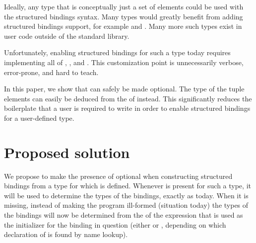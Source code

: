 Ideally, any type that is conceptually just a set of elements could be used with the structured bindings syntax. Many types would greatly benefit from adding structured bindings support, for example   and . Many more such types exist in user code outside of the standard library. 

Unfortunately, enabling structured bindings for such a type today requires implementing all of , , and . This customization point is unnecessarily verbose, error-prone, and hard to teach. 

In this paper, we show that  can safely be made optional. The type of the tuple elements can easily be deduced from the  of  instead. This significantly reduces the boilerplate that a user is required to write in order to enable structured bindings for a user-defined type.










\section{Proposed solution}
\label{sec:proposal}

We propose to make the presence of  optional when constructing structured bindings from a type for which  is defined. Whenever  is present for such a type, it will be used to determine the types of the bindings, exactly as today. When it is missing, instead of making the program ill-formed (situation today) the types of the bindings will now be determined from the  of the  expression that is used as the initializer for the binding in question (either  or , depending on which declaration of  is found by name lookup).

